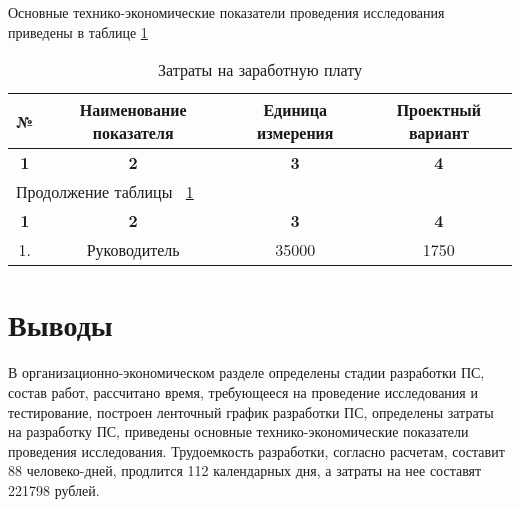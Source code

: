 Основные технико-экономические показатели проведения исследования приведены в таблице \ref{tab:eco_osn_tepp} 

\begin{center}
\begin{longtable}{|c|c|c|c|}
\caption{Затраты на заработную плату} \label{tab:eco_osn_tepp} \\ \hline
\multicolumn{1}{|c|}{\textbf{№}} & \multicolumn{1}{c|}{\textbf{Наименование показателя}} & 
\multicolumn{1}{p{3cm}|}{\textbf{Единица измерения}} &   \multicolumn{1}{c|}{\textbf{Проектный вариант}} \\ \hline 

\multicolumn{1}{|c|}{\textbf{1}} &   \multicolumn{1}{c|}{\textbf{2}} & 
\multicolumn{1}{c|}{\textbf{3}} & \multicolumn{1}{c|}{\textbf{4}} \\ \hline
\endfirsthead

\multicolumn{4}{|l|}{{Продолжение таблицы ~\ref{tab:eco_osn_tepp}}} \\ %
\hline
\multicolumn{1}{|c|}{\textbf{1}} &   \multicolumn{1}{c|}{\textbf{2}} & 
\multicolumn{1}{c|}{\textbf{3}} & \multicolumn{1}{c|}{\textbf{4}} \\ \hline
\endhead

\endfoot

\hline
\endlastfoot

1. & Руководитель & 35000 & 1750  \\ \hline

\hline

\end{longtable}
\end{center}

\newpage
\section{Выводы}
В организационно-экономическом разделе определены стадии разработки ПС, состав работ, рассчитано время, требующееся на
проведение исследования и тестирование, построен ленточный график разработки ПС, определены затраты на разработку ПС,
приведены основные технико-экономические показатели проведения исследования.
Трудоемкость разработки, согласно расчетам, составит 88 человеко-дней, продлится 112 календарных дня, а затраты на
нее составят 221798 рублей.

\newpage
